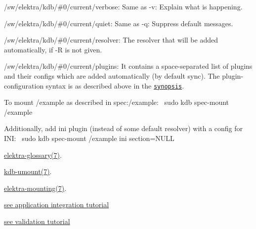 \begin{DoxyItemize}
\item {\ttfamily /sw/elektra/kdb/\#0/current/verbose}\+: Same as {\ttfamily -\/v}\+: Explain what is happening.
\item {\ttfamily /sw/elektra/kdb/\#0/current/quiet}\+: Same as {\ttfamily -\/q}\+: Suppress default messages.
\item {\ttfamily /sw/elektra/kdb/\#0/current/resolver}\+: The resolver that will be added automatically, if {\ttfamily -\/R} is not given.
\item {\ttfamily /sw/elektra/kdb/\#0/current/plugins}\+: It contains a space-\/separated list of plugins and their configs which are added automatically (by default sync). The plugin-\/configuration syntax is as described above in the \href{#SYNOPSIS}{\tt synopsis}.
\end{DoxyItemize}

To mount /example as described in {\ttfamily spec\+:/example}\+:~\newline
 {\ttfamily sudo kdb spec-\/mount /example}

Additionally, add {\ttfamily ini} plugin (instead of some default resolver) with a config for I\+NI\+:~\newline
 {\ttfamily sudo kdb spec-\/mount /example ini section=N\+U\+LL}


\begin{DoxyItemize}
\item \hyperlink{doc_help_elektra-glossary_md}{elektra-\/glossary(7)}.
\item \hyperlink{doc_help_kdb-umount_md}{kdb-\/umount(7)}.
\item \hyperlink{doc_help_elektra-mounting_md}{elektra-\/mounting(7)}.
\item \hyperlink{doc_tutorials_application-integration_md}{see application integration tutorial}
\item \hyperlink{doc_tutorials_validation_md}{see validation tutorial} 
\end{DoxyItemize}